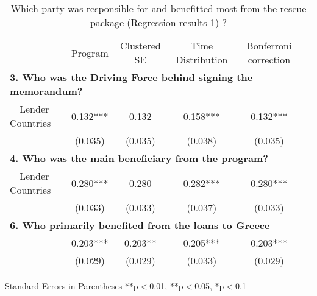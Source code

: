 \documentclass[12pt]{article}
\begin{document}
\begin{table}[h!]
\caption{Which party was responsible for and benefitted most from the rescue package (Regression results 1) ?} 
\begin{tabular}{l*{5}{c}}
\hline\hline
\ \  &Program & Clustered SE & Time Distribution & Bonferroni correction \\
\multicolumn{5}{l}{\textbf{3. Who was the Driving Force behind signing the memorandum?}} \\
\ \  Lender Countries &0.132{***}&0.132{}&0.158{***} & 0.132{***} \\ 
&(0.035) & (0.035) & (0.038)& (0.035)\\ 
\multicolumn{5}{l}{\textbf{4. Who was the main beneficiary from the program? }} \\ 
\ \  Lender Countries &0.280{***}&0.280{}&0.282{***}& 0.280{***}\\ 
&(0.033) & (0.033) & (0.037) & (0.033)   \\
\hline
\multicolumn{5}{l}{\textbf{6. Who primarily benefited from the loans to Greece}} \\
\ \   &0.203{***}  &0.203{**}&0.205{***} &0.203{***}\\ 
   &(0.029) & (0.029) & (0.033) & (0.029)   \\ 
\hline\hline
\end{tabular}
\begin{tablenotes}
\small
\item Standard-Errors in Parentheses \quad  ***p$<$0.01, **p$<$0.05, *p$<$0.1   
\end{tablenotes}
\end{table}

\newpage


\end{document}

